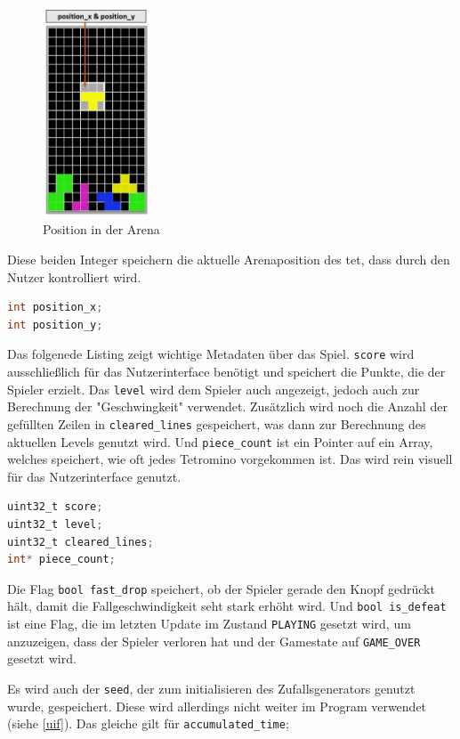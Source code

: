 \documentclass[11pt]{article}
\newcommand{\lstin}[1]{\lstinline[language=C]{#1}}
\begin{document}
\begin{figure}
  \includegraphics[width=120px]{../images/position.jpg}
  \vspace{-20pt}
  \caption{Position in der Arena}
  \vspace{-70pt}
\end{figure}

Diese beiden Integer speichern die aktuelle Arenaposition des \gls{tet}, dass durch den Nutzer kontrolliert wird.
\begin{lstlisting}[language=C]
int position_x;
int position_y;
\end{lstlisting}

Das folgenede Listing zeigt wichtige Metadaten über das Spiel. \lstin{score} wird ausschließlich für das Nutzerinterface benötigt und speichert die Punkte, die der Spieler erzielt.
Das \lstin{level} wird dem Spieler auch angezeigt, jedoch auch zur Berechnung der "Geschwingkeit" verwendet. 
Zusätzlich wird noch die Anzahl der gefüllten Zeilen in \lstin{cleared_lines} gespeichert, was dann zur Berechnung des aktuellen Levels genutzt wird.
Und \lstin{piece_count} ist ein Pointer auf ein Array, welches speichert, wie oft jedes Tetromino vorgekommen ist. Das wird rein visuell für das Nutzerinterface genutzt.

\begin{lstlisting}[language=C]
uint32_t score;
uint32_t level;
uint32_t cleared_lines;
int* piece_count;
\end{lstlisting}

Die Flag \lstin{bool fast_drop} speichert, ob der Spieler gerade den Knopf gedrückt hält, damit die Fallgeschwindigkeit seht stark erhöht wird.
Und \lstin{bool is_defeat} ist eine Flag, die im letzten Update im Zustand \lstin{PLAYING} gesetzt wird, um anzuzeigen, dass der Spieler verloren hat und der Gamestate auf \lstin{GAME_OVER} gesetzt wird.

Es wird auch der \lstin{seed}, der zum initialisieren des Zufallsgenerators genutzt wurde, gespeichert. Diese wird allerdings nicht weiter im Program verwendet (siehe \ref{uif}).
Das gleiche gilt für \lstin{accumulated_time};
\end{document}
